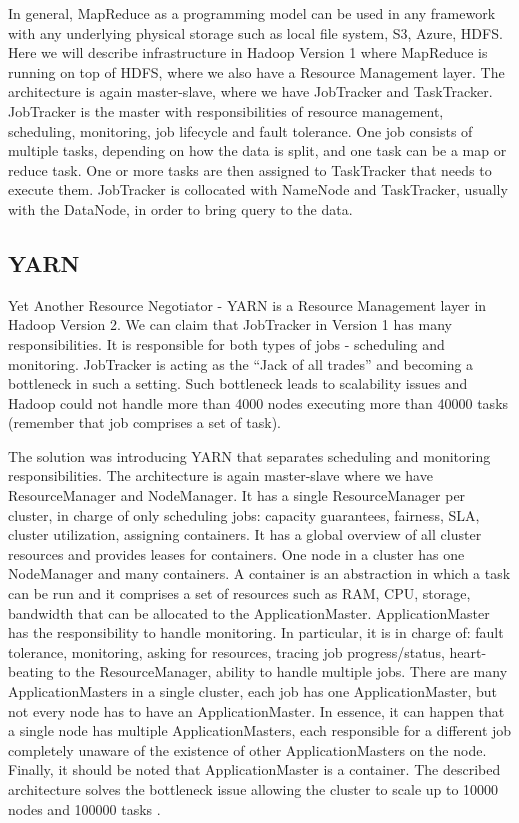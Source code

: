 In general, MapReduce as a programming model can be used in any framework with any underlying physical storage such as local file system, S3, Azure, HDFS. Here we will describe infrastructure in Hadoop Version 1 where MapReduce is running on top of HDFS, where we also have a Resource Management layer. The architecture is again master-slave, where we have JobTracker and TaskTracker. JobTracker is the master with responsibilities of resource management, scheduling, monitoring, job lifecycle and fault tolerance. One job consists of multiple tasks, depending on how the data is split, and one task can be a map or reduce task. One or more tasks are then assigned to TaskTracker that needs to execute them. JobTracker is collocated with NameNode and TaskTracker, usually with the DataNode, in order to bring query to the data. 

\subsection{YARN}
Yet Another Resource Negotiator -  YARN \cite{YARN} is a Resource Management layer in Hadoop Version 2. We can claim that JobTracker in Version 1 has many responsibilities. It is responsible for both types of jobs - scheduling and monitoring. JobTracker is acting as the ``Jack of all trades'' and becoming a bottleneck in such a setting. Such bottleneck leads to scalability issues and Hadoop could not handle more than 4000 nodes executing more than 40000 tasks (remember that job comprises a set of task). 

The solution was introducing YARN that separates scheduling and monitoring responsibilities. The architecture is again master-slave where we have ResourceManager and NodeManager. It has a single ResourceManager per cluster, in charge of only scheduling jobs: capacity guarantees, fairness, SLA, cluster utilization, assigning containers. It has a global overview of all cluster resources and provides leases for containers. One node in a cluster has one NodeManager and many containers. A container is an abstraction in which a task can be run and it comprises a set of resources such as RAM, CPU, storage, bandwidth that can be allocated to the ApplicationMaster. ApplicationMaster has the responsibility to handle monitoring. In particular, it is in charge of: fault tolerance, monitoring, asking for resources, tracing job progress/status, heart-beating to the ResourceManager, ability to handle multiple jobs. There are many ApplicationMasters in a single cluster, each job has one ApplicationMaster, but not every node has to have an ApplicationMaster. In essence, it can happen that a single node has multiple ApplicationMasters, each responsible for a different job completely unaware of the existence of other ApplicationMasters on the node. Finally, it should be noted that ApplicationMaster is a container. The described architecture solves the bottleneck issue allowing the cluster to scale up to 10000 nodes and 100000 tasks \cite{BigDataCourse}. %

